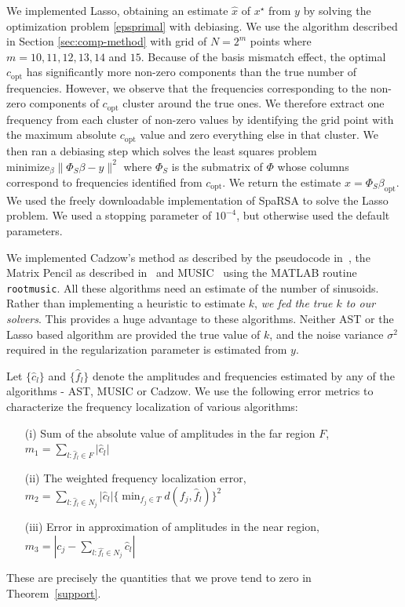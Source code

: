 We implemented Lasso, obtaining an estimate $\hat{x}$ of $x^\star$ from $y$ by
solving the optimization problem \eqref{epsprimal} with debiasing. We use the
algorithm described in Section \ref{sec:comp-method} with grid of $N=2^{m}$
points where $m=10,11,12,13,14$ and $15$. Because of the basis mismatch effect,
the optimal $c_{\mathrm{opt}}$ has significantly more non-zero components than
the true number of frequencies. However, we observe that the frequencies
corresponding to the non-zero components of $c_{\mathrm{opt}}$ cluster
around the true ones. We therefore extract one frequency from each cluster of
non-zero values by identifying the grid point with the maximum absolute
$c_{\mathrm{opt}}$ value and zero everything else in that cluster. We then ran
a debiasing step which solves the least squares problem $\mbox{minimize}_\beta
\|\Phi_S \beta- y\|^2$ where $\Phi_S$ is the submatrix of $\Phi$ whose columns
correspond to frequencies identified from $c_{\mathrm{opt}}$. We return the
estimate $\hat{x} = \Phi_S \beta_{\mathrm{opt}}$. We used the freely
downloadable implementation of SpaRSA to solve the Lasso problem. We used a
stopping parameter of $10^{-4}$, but otherwise used the default parameters.

We implemented Cadzow's method as described by the
pseudocode in~\cite{blu08}, the Matrix Pencil as described in~\cite{hua02} and
MUSIC~\cite{music} using the MATLAB routine \texttt{rootmusic}. All these
algorithms need an estimate of the number of sinusoids. Rather
than implementing a heuristic to estimate $k$, \emph{we fed the true $k$ to our
solvers}. This provides a huge advantage to these algorithms. Neither AST or the
Lasso based algorithm are provided the true value of $k$, and the noise 
variance $\sigma^2$ required in the regularization parameter is estimated from $y$.

Let $\{\hat{c}_l\}$ and $\{\hat{f}_l\}$ denote the amplitudes and frequencies
estimated by any of the algorithms - AST, MUSIC or Cadzow. We use the following
error metrics to characterize the frequency localization of various algorithms:
\begin{enumerate} \item[(i)] Sum of the absolute value of amplitudes in the far
region $F$, $m_1 = \sum_{l : \hat{f}_l \in F} |\hat{c}_l|$ \item[(ii)] The
weighted frequency localization error, $m_2 = \sum_{l : \hat{f}_l \in N_j}
|\hat{c}_l| \{ \min_{f_j \in T} d(f_j,\hat{f}_l) \}^2$ \item[(iii)] Error in
approximation of amplitudes in the near region, $m_3 = \left| c_j - \sum_{l :
\hat{f_l} \in N_j} \hat{c}_l \right|$ \end{enumerate} These are precisely the
quantities that we prove tend to zero in Theorem~\ref{support}.

